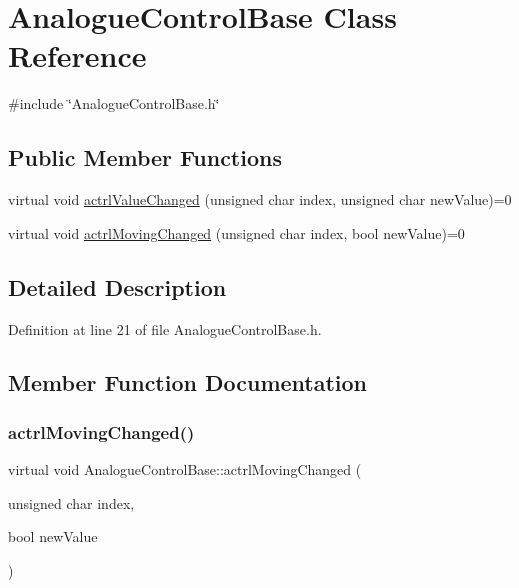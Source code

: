 \hypertarget{class_analogue_control_base}{}\section{Analogue\+Control\+Base Class Reference}
\label{class_analogue_control_base}


{\ttfamily \#include \char`\"{}Analogue\+Control\+Base.\+h\char`\"{}}

\subsection*{Public Member Functions}
\begin{DoxyCompactItemize}
\item 
virtual void \hyperlink{class_analogue_control_base_a9d18c3e299a69c909a3ad88b70524c5d}{actrl\+Value\+Changed} (unsigned char index, unsigned char new\+Value)=0
\item 
virtual void \hyperlink{class_analogue_control_base_ab680f6fd45ec093200d3d78744957c1b}{actrl\+Moving\+Changed} (unsigned char index, bool new\+Value)=0
\end{DoxyCompactItemize}


\subsection{Detailed Description}


Definition at line 21 of file Analogue\+Control\+Base.\+h.



\subsection{Member Function Documentation}
\mbox{\label{class_analogue_control_base_ab680f6fd45ec093200d3d78744957c1b}} 
\subsubsection{\texorpdfstring{actrl\+Moving\+Changed()}{actrlMovingChanged()}}
{\footnotesize\ttfamily virtual void Analogue\+Control\+Base\+::actrl\+Moving\+Changed (\begin{DoxyParamCaption}\item[{unsigned char}]{index,  }\item[{bool}]{new\+Value }\end{DoxyParamCaption})\hspace{0.3cm}{\ttfamily [pure virtual]}}


